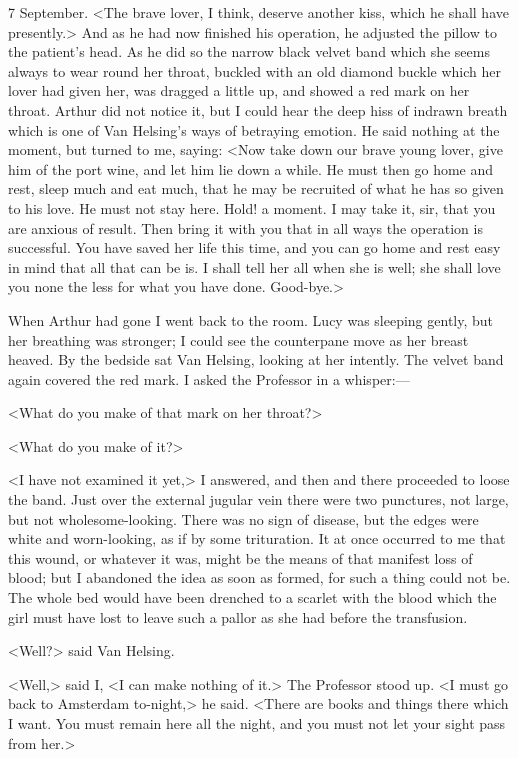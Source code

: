 \begin{diary}{7 September.}
<The brave lover, I think, deserve another kiss, which he shall have presently.> And as he had now finished his operation, he adjusted the pillow to the patient's head. As he did so the narrow black velvet band which she seems always to wear round her throat, buckled with an old diamond buckle which her lover had given her, was dragged a little up, and showed a red mark on her throat. Arthur did not notice it, but I could hear the deep hiss of indrawn breath which is one of Van Helsing's ways of betraying emotion. He said nothing at the moment, but turned to me, saying: <Now take down our brave young lover, give him of the port wine, and let him lie down a while. He must then go home and rest, sleep much and eat much, that he may be recruited of what he has so given to his love. He must not stay here. Hold! a moment. I may take it, sir, that you are anxious of result. Then bring it with you that in all ways the operation is successful. You have saved her life this time, and you can go home and rest easy in mind that all that can be is. I shall tell her all when she is well; she shall love you none the less for what you have done. Good-bye.>

When Arthur had gone I went back to the room. Lucy was sleeping gently, but her breathing was stronger; I could see the counterpane move as her breast heaved. By the bedside sat Van Helsing, looking at her intently. The velvet band again covered the red mark. I asked the Professor in a whisper:—

<What do you make of that mark on her throat?>

<What do you make of it?>

<I have not examined it yet,> I answered, and then and there proceeded to loose the band. Just over the external jugular vein there were two punctures, not large, but not wholesome-looking. There was no sign of disease, but the edges were white and worn-looking, as if by some trituration. It at once occurred to me that this wound, or whatever it was, might be the means of that manifest loss of blood; but I abandoned the idea as soon as formed, for such a thing could not be. The whole bed would have been drenched to a scarlet with the blood which the girl must have lost to leave such a pallor as she had before the transfusion.

<Well?> said Van Helsing.

<Well,> said I, <I can make nothing of it.> The Professor stood up. <I must go back to Amsterdam to-night,> he said. <There are books and things there which I want. You must remain here all the night, and you must not let your sight pass from her.>


\end{diary}
